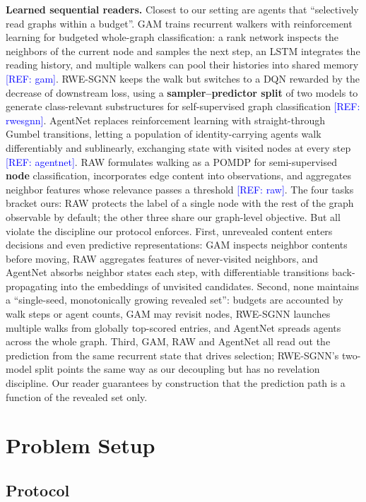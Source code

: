 \documentclass{article}
\newcommand{\refadd}[1]{\textcolor{blue}{[REF: #1]}}
\begin{document}
\textbf{Learned sequential readers.} Closest to our setting are agents that ``selectively read graphs within a budget''. GAM trains recurrent walkers with reinforcement learning for budgeted whole-graph classification: a rank network inspects the neighbors of the current node and samples the next step, an LSTM integrates the reading history, and multiple walkers can pool their histories into shared memory \refadd{gam}. RWE-SGNN keeps the walk but switches to a DQN rewarded by the decrease of downstream loss, using a \textbf{sampler--predictor split} of two models to generate class-relevant substructures for self-supervised graph classification \refadd{rwesgnn}. AgentNet replaces reinforcement learning with straight-through Gumbel transitions, letting a population of identity-carrying agents walk differentiably and sublinearly, exchanging state with visited nodes at every step \refadd{agentnet}. RAW formulates walking as a POMDP for semi-supervised \textbf{node} classification, incorporates edge content into observations, and aggregates neighbor features whose relevance passes a threshold \refadd{raw}. The four tasks bracket ours: RAW protects the label of a single node with the rest of the graph observable by default; the other three share our graph-level objective. But all violate the discipline our protocol enforces. First, unrevealed content enters decisions and even predictive representations: GAM inspects neighbor contents before moving, RAW aggregates features of never-visited neighbors, and AgentNet absorbs neighbor states each step, with differentiable transitions back-propagating into the embeddings of unvisited candidates. Second, none maintains a ``single-seed, monotonically growing revealed set'': budgets are accounted by walk steps or agent counts, GAM may revisit nodes, RWE-SGNN launches multiple walks from globally top-scored entries, and AgentNet spreads agents across the whole graph. Third, GAM, RAW and AgentNet all read out the prediction from the same recurrent state that drives selection; RWE-SGNN's two-model split points the same way as our decoupling but has no revelation discipline. Our reader guarantees by construction that the prediction path is a function of the revealed set only.

\section{Problem Setup}
\label{sec:setup}

\subsection{Protocol}
\label{subsec:protocol}
\end{document}
